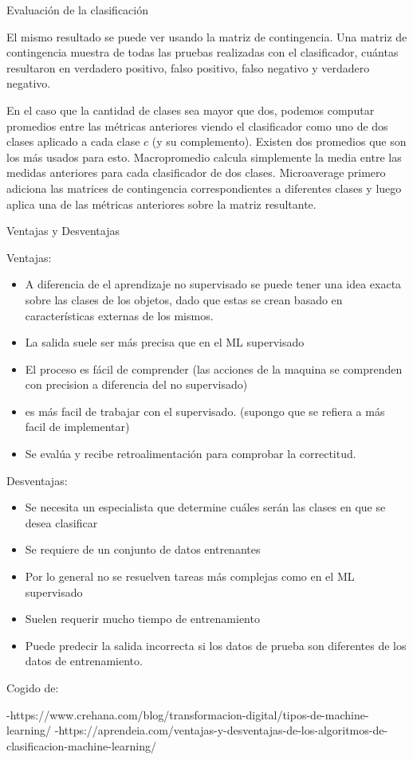 \documentclass{llncs}
\begin{document}
\begin{subsection}{Evaluaci\'on de la clasificaci\'on}
\begin{itemize}
				
			\end{itemize}
			
			El mismo resultado se puede ver usando la matriz de contingencia. Una matriz de contingencia muestra de todas las pruebas realizadas con el clasificador, cu\'antas resultaron en verdadero positivo, falso positivo, falso negativo y verdadero negativo.
			
			En el caso que la cantidad de clases sea mayor que dos, podemos computar promedios entre las m\'etricas anteriores viendo el clasificador como uno de dos clases aplicado a cada clase $c$ (y su complemento). Existen dos promedios que son los m\'as usados para esto. Macropromedio calcula simplemente la media entre las medidas anteriores para cada clasificador de dos clases. Microaverage primero adiciona las matrices de contingencia correspondientes a diferentes clases y luego aplica una de las m\'etricas anteriores sobre la matriz resultante. 
			
		\end{subsection}
			
		\begin{subsection}{Ventajas y Desventajas}
			
			Ventajas:
				\begin{itemize}
					\item A diferencia de el aprendizaje no supervisado se puede tener una idea exacta sobre las clases de los objetos, dado que estas se crean basado en caracter\'isticas externas de los mismos. 
					\item La salida suele ser m\'as precisa que en el ML supervisado
					\item El proceso es f\'acil de comprender (las acciones de la maquina se comprenden con precision a diferencia del no supervisado)
					\item es m\'as facil de trabajar con el supervisado. (supongo que se refiera a m\'as facil de implementar)
					\item Se eval\'ua y recibe retroalimentaci\'on para comprobar la correctitud. 
				\end{itemize}
			Desventajas:
				\begin{itemize}
					\item Se necesita un especialista que determine cu\'ales ser\'an las clases en que se desea clasificar
					\item Se requiere de un conjunto de datos entrenantes
					\item Por lo general no se resuelven tareas m\'as complejas como en el ML supervisado
					\item Suelen requerir mucho tiempo de entrenamiento
					\item Puede predecir la salida incorrecta si los datos de prueba son diferentes de los datos de entrenamiento.
				\end{itemize}
			Cogido de:
			
-https://www.crehana.com/blog/transformacion-digital/tipos-de-machine-learning/
-https://aprendeia.com/ventajas-y-desventajas-de-los-algoritmos-de-clasificacion-machine-learning/		
			
		\end{subsection}
			
\end{document}
